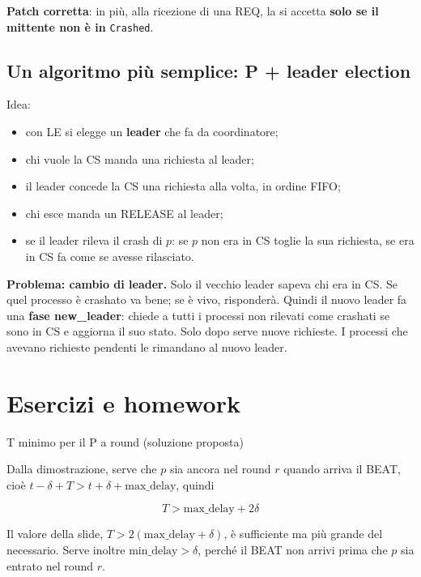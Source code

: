 \textbf{Patch corretta}: in più, alla ricezione di una REQ, la si accetta \textbf{solo se il mittente non è in} \texttt{Crashed}.

\subsection{Un algoritmo più semplice: P + leader election}

Idea:

\begin{itemize}
\tightlist
\item
  con LE si elegge un \textbf{leader} che fa da coordinatore;
\item
  chi vuole la CS manda una richiesta al leader;
\item
  il leader concede la CS una richiesta alla volta, in ordine FIFO;
\item
  chi esce manda un RELEASE al leader;
\item
  se il leader rileva il crash di \(p\): se \(p\) non era in CS toglie la sua richiesta, se era in CS fa come se avesse rilasciato.
\end{itemize}

\textbf{Problema: cambio di leader.} Solo il vecchio leader sapeva chi era in CS. Se quel processo è crashato va bene; se è vivo, risponderà. Quindi il nuovo leader fa una \textbf{fase new\_leader}: chiede a tutti i processi non rilevati come crashati se sono in CS e aggiorna il suo stato. Solo dopo serve nuove richieste. I processi che avevano richieste pendenti le rimandano al nuovo leader.

\section{Esercizi e homework}

\begin{approfondimento}{T minimo per il P a round (soluzione proposta)}

Dalla dimostrazione, serve che \(p\) sia ancora nel round \(r\) quando arriva il BEAT, cioè \(t - \delta + T > t + \delta + \text{max\_delay}\), quindi

\[
T > \text{max\_delay} + 2\delta
\]

Il valore della slide, \(T > 2(\text{max\_delay} + \delta)\), è sufficiente ma più grande del necessario. Serve inoltre \(\text{min\_delay} > \delta\), perché il BEAT non arrivi prima che \(p\) sia entrato nel round \(r\).

\end{approfondimento}

